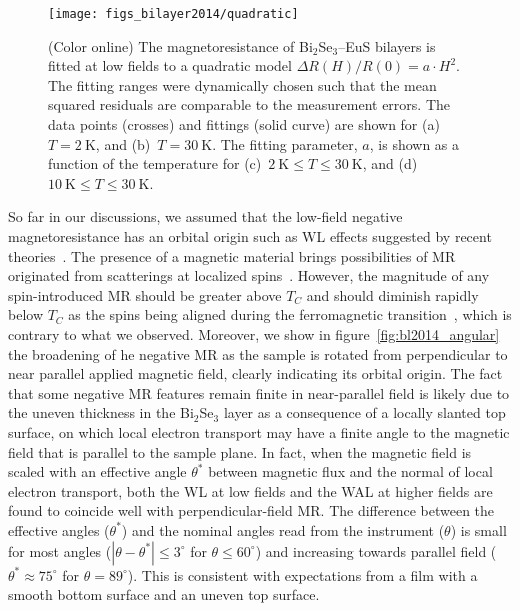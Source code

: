 %
%
\begin{figure}[ht]%
\centering%
\texttt{[image: figs\_bilayer2014/quadratic]}%
\caption[Quadratic fittings to the magnetoresistance of Bi$_2$Se$_3$--EuS bilayers]{\label{fig:bl2014_quadratic}(Color online) The magnetoresistance of Bi$_2$Se$_3$--EuS bilayers is fitted at low fields to a quadratic model $\Delta R(H) / R(0) = a\cdot H^2$. The fitting ranges were dynamically chosen such that the mean squared residuals are comparable to the measurement errors. The data points (crosses) and fittings (solid curve) are shown for (a)~$T=2~\mathrm{K}$, and (b)~$T=30~\mathrm{K}$. The fitting parameter, $a$, is shown as a function of the temperature for (c)~$2~\mathrm{K} \leq T \leq 30~\mathrm{K}$, and (d)~$10~\mathrm{K} \leq T \leq 30~\mathrm{K}$.}%
\end{figure}%
%

So far in our discussions, we assumed that the low-field negative magnetoresistance has an orbital origin such as WL effects suggested by recent theories~\cite{WL_WAL_competition, WL_Glazman, WL_bulk_Lu}. The presence of a magnetic material brings possibilities of MR originated from scatterings at localized spins~\cite{KondoMR}. However, the magnitude of any spin-introduced MR should be greater above $T_C$ and should diminish rapidly below $T_C$ as the spins being aligned during the ferromagnetic transition~\cite{SpinMagnetic}, which is contrary to what we observed. Moreover, we show in figure~\ref{fig:bl2014_angular} the broadening of he negative MR  as the sample is rotated  from perpendicular to near parallel applied magnetic field, clearly indicating its orbital origin. The fact that some negative  MR features remain finite in near-parallel field is likely due to the uneven thickness in the Bi$_2$Se$_3$ layer as a consequence of a locally slanted top surface, on which local electron transport may have a finite angle to the magnetic field that is parallel to the sample plane. In fact, when the magnetic field is scaled with an effective angle $\theta^*$ between magnetic flux and the normal of local electron transport, both the WL at low fields and the WAL at higher fields are found to coincide well with perpendicular-field MR. The difference between the effective angles ($\theta^*$) and the nominal angles read from the instrument ($\theta$) is small for most angles ($|\theta-\theta^*|\leq{}3^\circ$ for $\theta\leq{}60^\circ$) and increasing towards parallel field ($\theta^*\approx{}75^\circ$ for $\theta=89^\circ$). This is consistent with expectations from a film with a smooth bottom surface and an uneven top surface.

